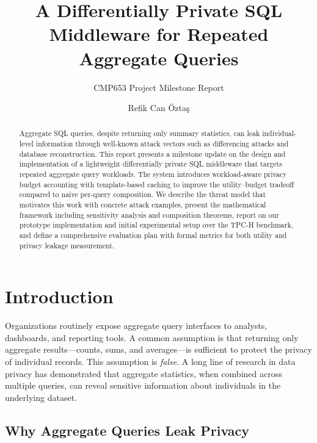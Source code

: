\documentclass[sigconf,nonacm]{acmart}
\begin{document}
\title{A Differentially Private SQL Middleware for Repeated Aggregate Queries}
\subtitle{CMP653 Project Milestone Report}

\author{Refik Can \"Ozta\c{s}}

\begin{abstract}
Aggregate SQL queries, despite returning only summary statistics, can leak individual-level information through well-known attack vectors such as differencing attacks and database reconstruction. This report presents a milestone update on the design and implementation of a lightweight differentially private SQL middleware that targets repeated aggregate query workloads. The system introduces workload-aware privacy budget accounting with template-based caching to improve the utility--budget tradeoff compared to naive per-query composition. We describe the threat model that motivates this work with concrete attack examples, present the mathematical framework including sensitivity analysis and composition theorems, report on our prototype implementation and initial experimental setup over the TPC-H benchmark, and define a comprehensive evaluation plan with formal metrics for both utility and privacy leakage measurement.
\end{abstract}

\maketitle

\section{Introduction}
\label{sec:intro}

Organizations routinely expose aggregate query interfaces to analysts, dashboards, and reporting tools. A common assumption is that returning only aggregate results---counts, sums, and averages---is sufficient to protect the privacy of individual records. This assumption is \emph{false}. A long line of research in data privacy has demonstrated that aggregate statistics, when combined across multiple queries, can reveal sensitive information about individuals in the underlying dataset.

\subsection{Why Aggregate Queries Leak Privacy}
\label{sec:why-leak}
\end{document}
